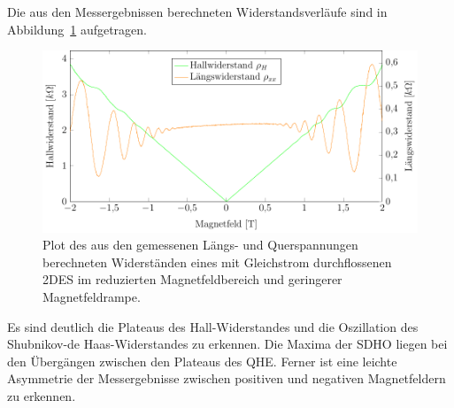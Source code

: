 Die aus den Messergebnissen berechneten Widerstandsverläufe sind in Abbildung~\ref{fig:2T_range_dc} aufgetragen.\\

\begin{figure}[h]
	\centering
	\includegraphics{graphs/dc/pm2T_range.pdf}
	\caption[Höher aufgelöste Gleichstrommessung in Magnetfeldteilbereich]{
		Plot des aus den gemessenen Längs- und Querspannungen berechneten Widerständen eines mit Gleichstrom durchflossenen 2DES im reduzierten Magnetfeldbereich und geringerer Magnetfeldrampe.
	}
	\label{fig:2T_range_dc}
\end{figure}


Es sind deutlich die Plateaus des Hall-Widerstandes und die Oszillation des Shubnikov-de Haas-Widerstandes zu erkennen. Die Maxima der SDHO liegen bei den Übergängen zwischen den Plateaus des QHE. Ferner ist eine leichte Asymmetrie der Messergebnisse zwischen positiven und negativen Magnetfeldern zu erkennen. 